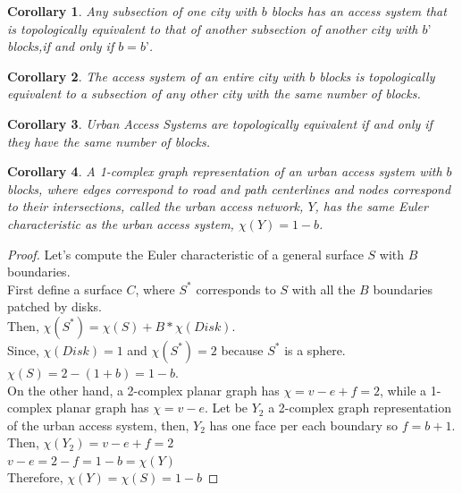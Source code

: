 \documentclass[10pt]{article}
\newtheorem{corollary}{Corollary}[theorem]
\begin{document}
\begin{corollary}
    Any subsection of one city with $b$ blocks has an access system that is topologically equivalent to that of another subsection of another city with $b’$ blocks,if and only if $b=b’$.
\end{corollary}

\begin{corollary}
    The access system of an entire city with $b$ blocks is topologically equivalent to a subsection of any other city with the same number of blocks.
\end{corollary}

\begin{corollary}
    Urban Access Systems are topologically equivalent if and only if they have the same number of blocks. 
\end{corollary}

\begin{corollary}
    A 1-complex graph representation of an urban access system with $b$ blocks, where edges correspond to road and path centerlines and nodes correspond to their intersections, called the urban access network, $Y$, has the same Euler characteristic as the urban access system, $\chi(Y)=1-b$. 
\end{corollary}
\begin{proof}
	Let's compute the Euler characteristic of a general surface $S$ with $B$ boundaries.\\
	
	First define a surface $C$, where $S^*$ corresponds to $S$ with all the $B$ boundaries patched by disks.\\
	
	Then,	$\chi(S^*)=\chi(S)+B*\chi(Disk)$.\\
	Since, $\chi(Disk)=1$ and $\chi(S^*)=2$ because $S^*$ is a sphere.\\
	
	$\chi(S)=2-(1+b)=1-b$.\\
	
	On the other hand, a 2-complex planar graph has $\chi=v-e+f=2$, while a 1-complex planar graph has $\chi=v-e$. Let be $Y_2$ a 2-complex graph representation of the urban access system, then, $Y_2$ has one face per each boundary so $f=b+1$.\\
	
	Then,	$\chi(Y_2)=v-e+f=2$\\
	$v-e=2-f=1-b=\chi(Y)$\\
	Therefore, $\chi(Y)=\chi(S)=1-b$
\end{proof}
\end{document}

